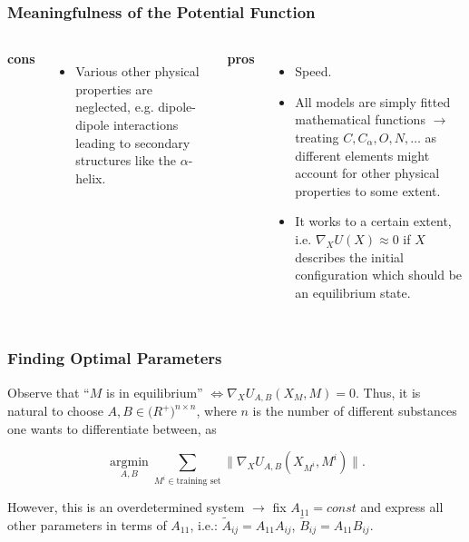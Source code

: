 \documentclass{beamer}
\begin{document}

\begin{frame}
\frametitle{Meaningfulness of the Potential Function}
\begin{columns}[t]

\textbf{cons}
\begin{itemize}
	\item Various other physical properties are neglected, e.g. dipole-dipole interactions leading to secondary structures like the $\alpha$-helix.
\end{itemize}

\textbf{pros}
\begin{itemize}
	\item<2-> Speed.
	\item<3-> All models are simply fitted mathematical functions $\rightarrow$ treating $C,C_\alpha,O,N,\dots$ as different elements might account for other physical properties to some extent.
	\item<4-> It works to a certain extent, i.e. $\nabla_X U(X)\approx 0$ if $X$ describes the initial configuration which should be an equilibrium state.
\end{itemize}

\end{columns}


\end{frame}


\begin{frame}
\frametitle{Finding Optimal Parameters}
Observe that ``$M$ is in equilibrium'' $\Leftrightarrow \nabla_X U_{A,B}(X_M,M)=0$.
Thus, it is natural to choose $A,B \in\mathbb (R^+)^{n\times n}$, where $n$ is the number of different substances one wants to differentiate between, as

$$\underset{A,B}{\operatorname{argmin}} \sum_{M^i\in\text{training set}}\|\nabla_X U_{A,B}(X_{M^i},M^i)\|.$$

However, this is an overdetermined system $\rightarrow$ fix $A_{11} = \textit{const}$ and express all other parameters in terms of $A_{11}$, i.e.: $\tilde A_{ij} = A_{11}A_{ij}$, $\tilde B_{ij} = A_{11}B_{ij}$.

\end{frame}

\end{document}
